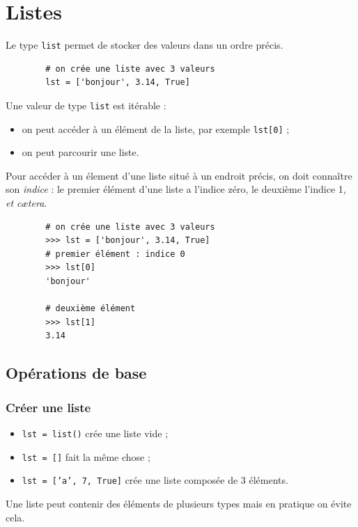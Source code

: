 \chapter*{Listes}

Le type \texttt{list} permet de stocker des valeurs dans un ordre précis.
\begin{pyc}
	\begin{verbatim}
		# on crée une liste avec 3 valeurs
		lst = ['bonjour', 3.14, True]
	\end{verbatim}
\end{pyc}
Une valeur de type \texttt{list} est itérable :
\begin{itemize}
	\item on peut accéder à un élément de la liste, par exemple \texttt{lst[0]} ;
	\item on peut parcourir une liste.
\end{itemize}

Pour accéder à un élement d'une liste situé à un endroit précis, on doit connaître son \textit{indice} : le premier élément d'une liste a l'indice zéro, le deuxième l'indice 1, \textit{et cætera}.

\begin{pyc}
	\begin{verbatim}
		# on crée une liste avec 3 valeurs
		>>> lst = ['bonjour', 3.14, True]
		# premier élément : indice 0
		>>> lst[0]
		'bonjour'

		# deuxième élément
		>>> lst[1] 
		3.14
	\end{verbatim}
\end{pyc}

\section{Opérations de base}

\subsection{Créer une liste}

\begin{itemize}
	\item \texttt{lst = list()} crée une liste vide ;
	\item \texttt{lst = []} fait la même chose ;
	\item  \texttt{lst = ['a', 7, True]} crée une liste composée de 3 éléments.
\end{itemize}
Une liste peut contenir des éléments de plusieurs types mais en pratique on évite cela.


